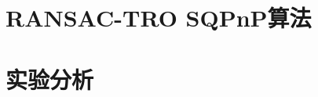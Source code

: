\section{RANSAC-TRO SQPnP算法}






\section{实验分析}
\label{sec:RANSAC-TRO-SQPnP:ExperimentCompare}
\vspace{1ex}
%		
%		
%		
%		
%		
%		


